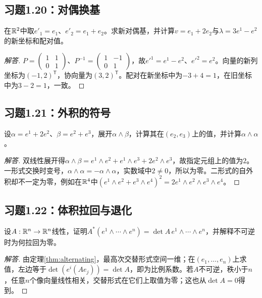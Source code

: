 \subsection*{习题1.20：对偶换基}
在$\mathbb{R}^2$中取$e'_1=e_1$、$e'_2=e_1+e_2$。求新对偶基，并计算$v=e_1+2e_2$与$\lambda=3e^1-e^2$的新坐标和配对值。
\begin{proof}[解答]
$P=\left(\begin{smallmatrix}1&1\\0&1\end{smallmatrix}\right)$、$P^{-1}=\left(\begin{smallmatrix}1&-1\\0&1\end{smallmatrix}\right)$，故$e'^1=e^1-e^2$、$e'^2=e^2$。向量的新列坐标为$(-1,2)^{\mathsf T}$，协向量为$(3,2)^{\mathsf T}$。配对在新坐标中为$-3+4=1$，在旧坐标中为$3-2=1$，一致。
\end{proof}
\subsection*{习题1.21：外积的符号}
设$\alpha=e^1+2e^2$、$\beta=e^2+e^3$，展开$\alpha\wedge\beta$，计算其在$(e_2,e_3)$上的值，并计算$\alpha\wedge\alpha$。
\begin{proof}[解答]
双线性展开得$\alpha\wedge\beta=e^1\wedge e^2+e^1\wedge e^3+2e^2\wedge e^3$，故指定元组上的值为$2$。一形式交换时变号，$\alpha\wedge\alpha=-\alpha\wedge\alpha$，实数域中$2\ne0$，所以为零。二形式的自外积却不一定为零，例如在$\mathbb{R}^4$中$(e^1\wedge e^2+e^3\wedge e^4)^2=2e^1\wedge e^2\wedge e^3\wedge e^4$。
\end{proof}
\subsection*{习题1.22：体积拉回与退化}
设$A:\mathbb{R}^n\to\mathbb{R}^n$线性，证明$A^*(e^1\wedge\cdots\wedge e^n)=\det A\,e^1\wedge\cdots\wedge e^n$，并解释不可逆时为何拉回为零。
\begin{proof}[解答]
由定理\ref{thm:alternating}，最高次交替形式空间一维；在$(e_1,\ldots,e_n)$上求值，左边等于$\det(e^i(Ae_j))=\det A$，即为比例系数。若$A$不可逆，秩小于$n$，任意$n$个像向量线性相关，交替形式在它们上取值为零；这也从$\det A=0$得到。
\end{proof}
